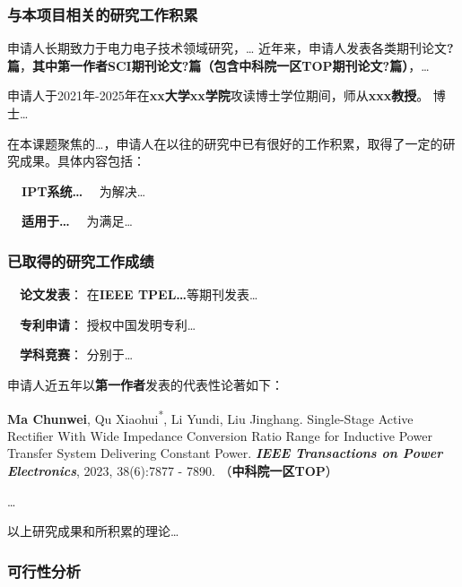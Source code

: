 \justifying
\NSFCBodyText

\subsubsection{与本项目相关的研究工作积累}

申请人长期致力于电力电子技术领域研究，\dots
近年来，申请人发表各类期刊论文\textbf{?篇}，\textbf{其中\textcolor{MsBlue}{第一作者}SCI期刊论文?篇（包含\textcolor{MsBlue}{中科院一区TOP期刊论文?篇）}}，\dots

申请人于2021年-2025年在\textbf{xx大学xx学院}攻读博士学位期间，师从\textcolor{MsBlue}{\textbf{xxx教授}}。
博士\dots

在本课题聚焦的\dots，申请人在以往的研究中已有很好的工作积累，取得了一定的研究成果。具体内容包括：

\textbf{~~IPT系统\dots}~~
为解决\dots

\textbf{~~适用于\dots}~~
为满足\dots

\subsubsection{已取得的研究工作成绩}

~~\textbf{论文发表}：
在\textbf{IEEE TPEL\dots}等期刊发表\dots

~~\textbf{专利申请}：
授权中国发明专利\dots

~~\textbf{学科竞赛}：
分别于\dots

申请人近五年以\textbf{第一作者}发表的代表性论著如下：
\begin{enumerate}[label={[\arabic*]}, leftmargin=*, itemindent=0em, labelsep=0.5em]
	\item \textcolor{MsBlue}{\textbf{Ma Chunwei}}, Qu Xiaohui\textsuperscript{*}, Li Yundi, Liu Jinghang. Single-Stage Active Rectifier With Wide Impedance Conversion Ratio Range for Inductive Power Transfer System Delivering Constant Power. {\it \textbf{IEEE Transactions on Power Electronics}}, 2023, 38(6):7877 - 7890. （\textcolor{MsBlue}{\textbf{中科院一区TOP}}）
	\item \dots
\end{enumerate}

以上研究成果和所积累的理论\dots

\subsubsection{可行性分析}

